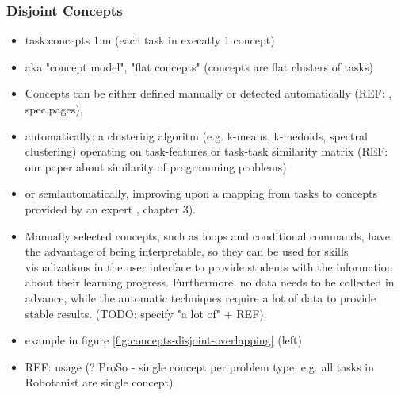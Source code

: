 \subsubsection{\textbf{Disjoint Concepts}}
\begin{itemize}
\item task:concepts 1:m (each task in execatly 1 concept)
\item aka "concept model", "flat concepts" (concepts are flat clusters of tasks)
\item Concepts can be either defined manually or detected automatically
  (REF: \cite{niznan-thesis, rihak-phd}, spec.pages),
\item automatically: a clustering algoritm (e.g. k-means, k-medoids, spectral clustering)
  operating on task-features or task-task similarity matrix
  (REF: our paper about similarity of programming problems)
\item or semiautomatically, improving upon a mapping from tasks to concepts
    provided by an expert \cite{its-domain-models}, chapter 3).
\item Manually selected concepts, such as loops and conditional commands,
  have the advantage of being interpretable,
  so they can be used for skills visualizations in the user interface
  to provide students with the information about their learning progress.
  Furthermore, no data needs to be collected in advance,
  while the automatic techniques require a lot of data to provide stable results.
  (TODO: specify "a lot of" + REF).
\item example in figure \ref{fig:concepts-disjoint-overlapping} (left)
\item REF: usage (? ProSo - single concept per problem type, e.g. all tasks in Robotanist are single concept)
\end{itemize}


